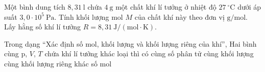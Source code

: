 \begin{ex}
Một bình dung tích $8,31\ \mathrm{l}$ chứa $4\ \mathrm{g}$ một chất khí lí tưởng ở nhiệt độ $27\ ^\circ\mathrm{C}$ dưới áp suất $3,0 \cdot 10^5\ \mathrm{Pa}$. Tính khối lượng mol $M$ của chất khí này theo đơn vị $\mathrm{g/mol}$. Lấy hằng số khí lí tưởng $R = 8,31\ \mathrm{J/(mol\cdot K)}$.
\end{ex}

\begin{ex}
Trong dạng “Xác định số mol, khối lượng và khối lượng riêng của khí”, Hai bình cùng p, $V$, $T$ chứa khí lí tưởng khác loại thì có
\choice
{\True cùng số phân tử}
{cùng khối lượng}
{cùng khối lượng riêng}
{khác số mol}
\end{ex}

